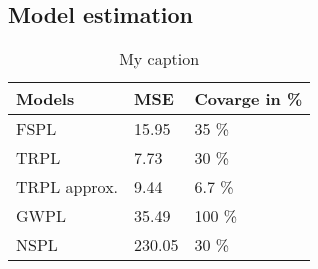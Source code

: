 \subsection{Model estimation}









\begin{table}[!htbp]
\centering
\begin{tabular}{|l|l|l|}
\hline
\textbf{Models} & \textbf{MSE} & \textbf{Covarge in \%} \\ \hline
FSPL            & 15.95        & 35 \%                  \\ \hline
TRPL            & 7.73         & 30 \%                  \\ \hline
TRPL approx.    & 9.44         & 6.7 \%                 \\ \hline
GWPL            & 35.49        & 100 \%                 \\ \hline
NSPL            & 230.05       & 30 \%                  \\ \hline
\end{tabular}
\caption{My caption}
\label{my-label}
\end{table}



